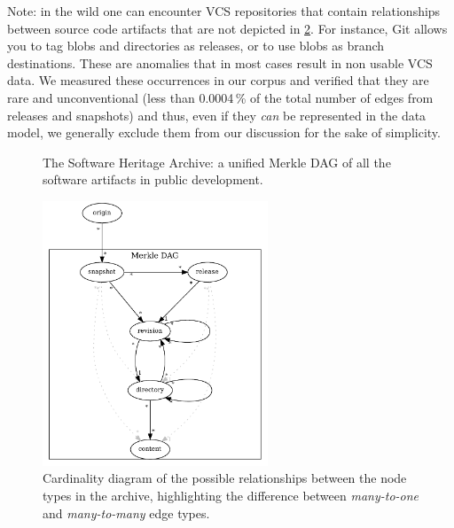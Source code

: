 Note: in the wild one can encounter VCS repositories that contain relationships
between source code artifacts that are not depicted in
\cref{fig:swh-cardinality}.
For instance, Git allows you to tag blobs and directories as releases, or to
use blobs as branch destinations.
These are anomalies that in most cases result in non usable VCS data.  We
measured these occurrences in our corpus and verified that they are rare and
unconventional (less than 0.0004\,\% of the total number of edges from releases
and snapshots) and thus, even if they \emph{can} be represented in the \SWH{}
data model, we generally exclude them from our discussion for the sake of
simplicity.

\begin{figure}
    \centering
    
    \caption{The Software Heritage Archive: a unified Merkle \gls{DAG} of all
    the software artifacts in public development.}%
    \label{fig:swh-model}
\end{figure}

\begin{figure}
    \centering
    \includegraphics[width=0.6\textwidth]{img/swh-cardinality}
    \caption{Cardinality diagram of the possible relationships between the node
    types in the archive, highlighting the difference between
    \emph{many-to-one} and \emph{many-to-many} edge types.}%
    \label{fig:swh-cardinality}
\end{figure}

